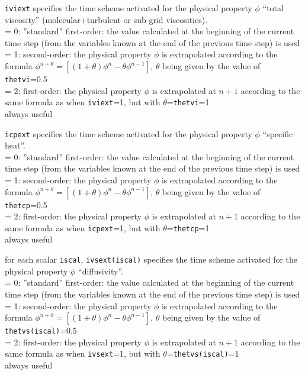 {{\tt iviext} specifies the time scheme activated
for the physical property $\phi$ ``total viscosity''
(molecular+turbulent or sub-grid viscosities).\\
\hspace*{1.3cm}= 0: ''standard'' first-order: the value calculated at
the beginning of the current time step (from the
variables known at the end of the previous time step) is used \\
\hspace*{1.3cm}= 1: second-order: the physical property $\phi$ is
extrapolated according to the formula
$\phi^{n+\theta}=[(1+\theta)\phi^n-\theta \phi^{n-1}]$, $\theta$ being
given by the value of {\tt thetvi}=0.5 \\
\hspace*{1.3cm}= 2: first-order: the physical property $\phi$ is
extrapolated at $n+1$ according to the
same formula as when {\tt iviext}=1, but with $\theta$={\tt thetvi}=1\\
always useful}

{{\tt icpext} specifies the time scheme activated
for the physical property $\phi$ ``specific heat''.\\
\hspace*{1.3cm}= 0: ''standard'' first-order: the value calculated at
the beginning of the current time step (from the
variables known at the end of the previous time step) is used \\
\hspace*{1.3cm}= 1: second-order: the physical property $\phi$ is
extrapolated according to the formula
$\phi^{n+\theta}=[(1+\theta)\phi^n-\theta \phi^{n-1}]$, $\theta$ being
given by the value of {\tt thetcp}=0.5 \\
\hspace*{1.3cm}= 2: first-order: the physical property $\phi$ is
extrapolated at $n+1$ according to the
same formula as when {\tt icpext}=1, but with $\theta$={\tt thetcp}=1\\
always useful}

{for each scalar {\tt iscal}, {\tt ivsext(iscal)} specifies the time scheme
activated for the physical property $\phi$ ``diffusivity''.\\
\hspace*{1.3cm}= 0: ''standard'' first-order: the value calculated at
the beginning of the current time step (from the
variables known at the end of the previous time step) is used \\
\hspace*{1.3cm}= 1: second-order: the physical property $\phi$ is
extrapolated according to the formula
$\phi^{n+\theta}=[(1+\theta)\phi^n-\theta \phi^{n-1}]$, $\theta$ being
given by the value of {\tt thetvs(iscal)}=0.5 \\
\hspace*{1.3cm}= 2: first-order: the physical property $\phi$ is
extrapolated at $n+1$ according to the
same formula as when {\tt ivsext}=1, but with $\theta$={\tt thetvs(iscal)}=1\\
always useful}

